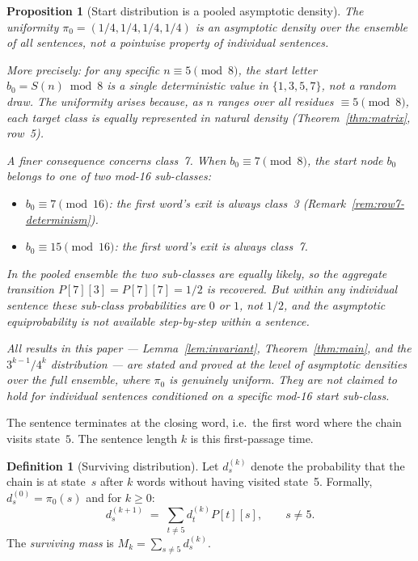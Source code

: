 \documentclass[12pt]{article}
\newtheorem{proposition}[theorem]{Proposition}
\theoremstyle{definition}
\newtheorem{definition}[theorem]{Definition}
\theoremstyle{remark}
\newcommand{\Sm}{S}
\begin{document}
\begin{proposition}[Start distribution is a pooled asymptotic density]
\label{prop:start-density}
The uniformity $\pi_0 = (1/4,1/4,1/4,1/4)$ is an \emph{asymptotic density}
over the ensemble of all sentences, not a pointwise property of
individual sentences.

More precisely: for any specific $n \equiv 5 \pmod 8$, the start letter
$b_0 = \Sm(n) \bmod 8$ is a single deterministic value in $\{1,3,5,7\}$, not
a random draw.
The uniformity arises because, as $n$ ranges over all residues $\equiv 5 \pmod 8$,
each target class is equally represented in natural density
(Theorem~\ref{thm:matrix}, row~5).

A finer consequence concerns class~7.
When $b_0 \equiv 7 \pmod 8$, the start node $b_0$ belongs to one of two
mod-16 sub-classes:
\begin{itemize}
  \item $b_0 \equiv 7 \pmod{16}$: the first word's exit is \emph{always} class~3
        (Remark~\ref{rem:row7-determinism}).
  \item $b_0 \equiv 15 \pmod{16}$: the first word's exit is \emph{always} class~7.
\end{itemize}
In the pooled ensemble the two sub-classes are equally likely, so the
aggregate transition $P[7][3] = P[7][7] = 1/2$ is recovered.
But within any individual sentence these sub-class probabilities are $0$ or $1$,
not $1/2$, and the asymptotic equiprobability is not available step-by-step
within a sentence.

All results in this paper — Lemma~\ref{lem:invariant}, Theorem~\ref{thm:main},
and the $3^{k-1}/4^k$ distribution — are stated and proved at the level of
asymptotic densities over the full ensemble, where $\pi_0$ is genuinely
uniform.
They are not claimed to hold for individual sentences conditioned on a
specific mod-16 start sub-class.
\end{proposition}

The sentence terminates at the closing word, i.e.\ the first word where
the chain visits state~$5$.
The sentence length $k$ is this first-passage time.

\begin{definition}[Surviving distribution]
\label{def:surviving}
Let $d_s^{(k)}$ denote the probability that the chain is at state~$s$
after $k$ words without having visited state~5. Formally,
$d_s^{(0)} = \pi_0(s)$ and for $k \geq 0$:
\[
  d_s^{(k+1)} \;=\; \sum_{t \neq 5} d_t^{(k)} P[t][s],
  \qquad s \neq 5.
\]
The \emph{surviving mass} is $M_k = \sum_{s \neq 5} d_s^{(k)}$.
\end{definition}
\end{document}
